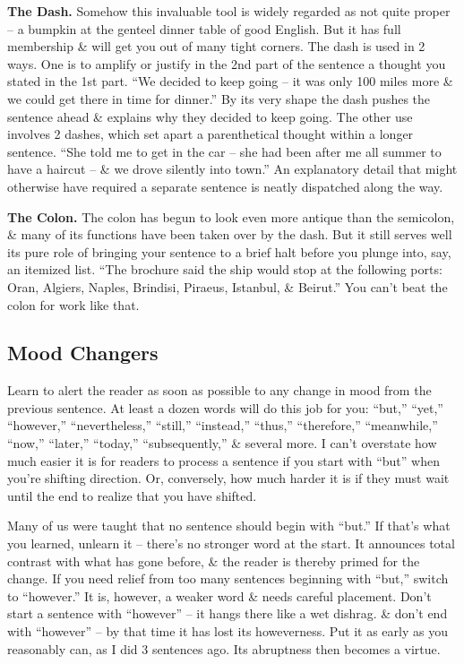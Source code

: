\documentclass{article}
\begin{document}
\textbf{The Dash.} Somehow this invaluable tool is widely regarded as not quite proper -- a bumpkin at the genteel dinner table of good English. But it has full membership \& will get you out of many tight corners. The dash is used in 2 ways. One is to amplify or justify in the 2nd part of the sentence a thought you stated in the 1st part. ``We decided to keep going -- it was only 100 miles more \& we could get there in time for dinner.'' By its very shape the dash pushes the sentence ahead \& explains why they decided to keep going. The other use involves 2 dashes, which set apart a parenthetical thought within a longer sentence. ``She told me to get in the car -- she had been after me all summer to have a haircut -- \& we drove silently into town.'' An explanatory detail that might otherwise have required a separate sentence is neatly dispatched along the way.

\textbf{The Colon.} The colon has begun to look even more antique than the semicolon, \& many of its functions have been taken over by the dash. But it still serves well its pure role of bringing your sentence to a brief halt before you plunge into, say, an itemized list. ``The brochure said the ship would stop at the following ports: Oran, Algiers, Naples, Brindisi, Piraeus, Istanbul, \& Beirut.'' You can't beat the colon for work like that.

\subsection{Mood Changers}
Learn to alert the reader as soon as possible to any change in mood from the previous sentence. At least a dozen words will do this job for you: ``but,'' ``yet,'' ``however,'' ``nevertheless,'' ``still,'' ``instead,'' ``thus,'' ``therefore,'' ``meanwhile,'' ``now,'' ``later,'' ``today,'' ``subsequently,'' \& several more. I can't overstate how much easier it is for readers to process a sentence if you start with ``but'' when you're shifting direction. Or, conversely, how much harder it is if they must wait until the end to realize that you have shifted.

Many of us were taught that no sentence should begin with ``but.'' If that's what you learned, unlearn it -- there's no stronger word at the start. It announces total contrast with what has gone before, \& the reader is thereby primed for the change. If you need relief from too many sentences beginning with ``but,'' switch to ``however.'' It is, however, a weaker word \& needs careful placement. Don't start a sentence with ``however'' -- it hangs there like a wet dishrag. \& don't end with ``however'' -- by that time it has lost its howeverness. Put it as early as you reasonably can, as I did 3 sentences ago. Its abruptness then becomes a virtue.
\end{document}

